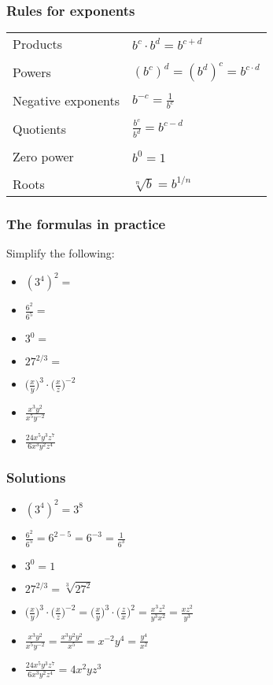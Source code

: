 \documentclass[xcolor=dvipsnames, 9pt]{beamer} %
\begin{document}
\begin{frame}
\frametitle{Rules for exponents}

\begin{table}[]
\begin{tabular}{ll}
Products & $b^c \cdot b^d = b^{c+d} $ \\
\\ Powers & $(b^c)^d = (b^d)^c = b^{c \cdot d}$ \\
\\ Negative exponents & $b^{-c} = \frac{1}{b^c}$ \\
\\ Quotients & $\frac{b^c}{b^d} = b^{c-d}$ \\
\\ Zero power & $b^0 = 1$ \\
\\ Roots & $\sqrt[n]{b} = b^{1/n}$
\end{tabular}
\end{table}
\end{frame}

\begin{frame}
\frametitle{The formulas in practice}
Simplify the following: 

\begin{itemize}
\setlength\itemsep{1em}
\item $(3^4)^2 =$ 
\item $\frac{6^2}{6^5} =$ 
\item $3^0 =$ 
\item $27^{2/3} =$  
\item $\bigg( \frac{x}{y} \bigg)^3 \cdot \bigg( \frac{x}{z} \bigg)^{-2}$
\item $\frac{x^3y^2}{x^5y^{-2}}$
\item $\frac{24x^5 y^3 z^7}{6x^3 y^2 z^4}$
\end{itemize}
\end{frame}

\begin{frame}
\frametitle{Solutions}
\begin{itemize}
    \itemsep\setlength{1em}
\item $(3^4)^2 = 3^8$ 
\item $\frac{6^2}{6^5} = 6^{2-5} = 6^{-3} = \frac{1}{6^3}$ 
\item $3^0 = 1$ 
\item $27^{2/3} = \sqrt[3]{27^2}$  
\item $\bigg( \frac{x}{y} \bigg)^3 \cdot \bigg( \frac{x}{z} \bigg)^{-2} = \bigg( \frac{x}{y} \bigg)^3 \cdot \bigg( \frac{z}{x} \bigg)^{2} = \frac{x^3z^2}{y^3x^2} = \frac{xz^2}{y^3}$
\item $\frac{x^3y^2}{x^5y^{-2}} = \frac{x^3y^2y^2}{x^5} = x^{-2}y^4 = \frac{y^4}{x^2}$
\item $\frac{24x^5 y^3 z^7}{6x^3 y^2 z^4} = 4x^2yz^3$
\end{itemize}
\end{frame}
\end{document}
